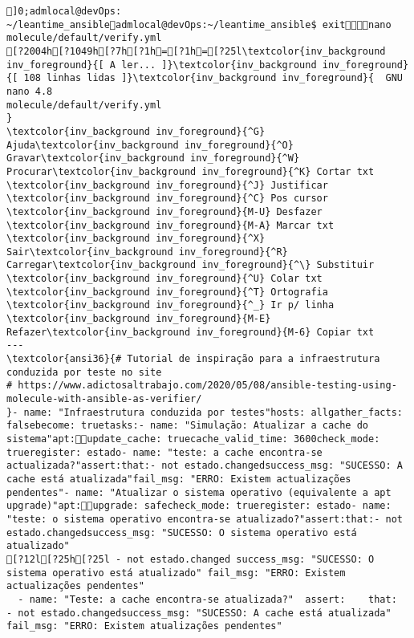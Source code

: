 \documentclass{scrartcl}
\title{}
\begin{document}
\begin{Verbatim}
]0;admlocal@devOps: ~/leantime_ansibleadmlocal@devOps:~/leantime_ansible$ exitnano molecule/default/verify.yml 
[?2004h[?1049h[?7h[?1h=[?1h=[?25l\textcolor{inv_background inv_foreground}{[ A ler... ]}\textcolor{inv_background inv_foreground}{[ 108 linhas lidas ]}\textcolor{inv_background inv_foreground}{  GNU nano 4.8                                          molecule/default/verify.yml                                                       }
\textcolor{inv_background inv_foreground}{^G} Ajuda\textcolor{inv_background inv_foreground}{^O} Gravar\textcolor{inv_background inv_foreground}{^W} Procurar\textcolor{inv_background inv_foreground}{^K} Cortar txt    \textcolor{inv_background inv_foreground}{^J} Justificar    \textcolor{inv_background inv_foreground}{^C} Pos cursor    \textcolor{inv_background inv_foreground}{M-U} Desfazer     \textcolor{inv_background inv_foreground}{M-A} Marcar txt
\textcolor{inv_background inv_foreground}{^X} Sair\textcolor{inv_background inv_foreground}{^R} Carregar\textcolor{inv_background inv_foreground}{^\} Substituir    \textcolor{inv_background inv_foreground}{^U} Colar txt     \textcolor{inv_background inv_foreground}{^T} Ortografia    \textcolor{inv_background inv_foreground}{^_} Ir p/ linha   \textcolor{inv_background inv_foreground}{M-E} Refazer\textcolor{inv_background inv_foreground}{M-6} Copiar txt
---
\textcolor{ansi36}{# Tutorial de inspiração para a infraestrutura conduzida por teste no site
# https://www.adictosaltrabajo.com/2020/05/08/ansible-testing-using-molecule-with-ansible-as-verifier/
}- name: "Infraestrutura conduzida por testes"hosts: allgather_facts: falsebecome: truetasks:- name: "Simulação: Atualizar a cache do sistema"apt:update_cache: truecache_valid_time: 3600check_mode: trueregister: estado- name: "teste: a cache encontra-se actualizada?"assert:that:- not estado.changedsuccess_msg: "SUCESSO: A cache está atualizada"fail_msg: "ERRO: Existem actualizações pendentes"- name: "Atualizar o sistema operativo (equivalente a apt upgrade)"apt:upgrade: safecheck_mode: trueregister: estado- name: "teste: o sistema operativo encontra-se atualizado?"assert:that:- not estado.changedsuccess_msg: "SUCESSO: O sistema operativo está atualizado"
[?12l[?25h[?25l - not estado.changed success_msg: "SUCESSO: O sistema operativo está atualizado" fail_msg: "ERRO: Existem actualizações pendentes"
  - name: "Teste: a cache encontra-se atualizada?"  assert:    that:    - not estado.changedsuccess_msg: "SUCESSO: A cache está atualizada"    fail_msg: "ERRO: Existem atualizações pendentes"

\end{Verbatim}
\end{document}
